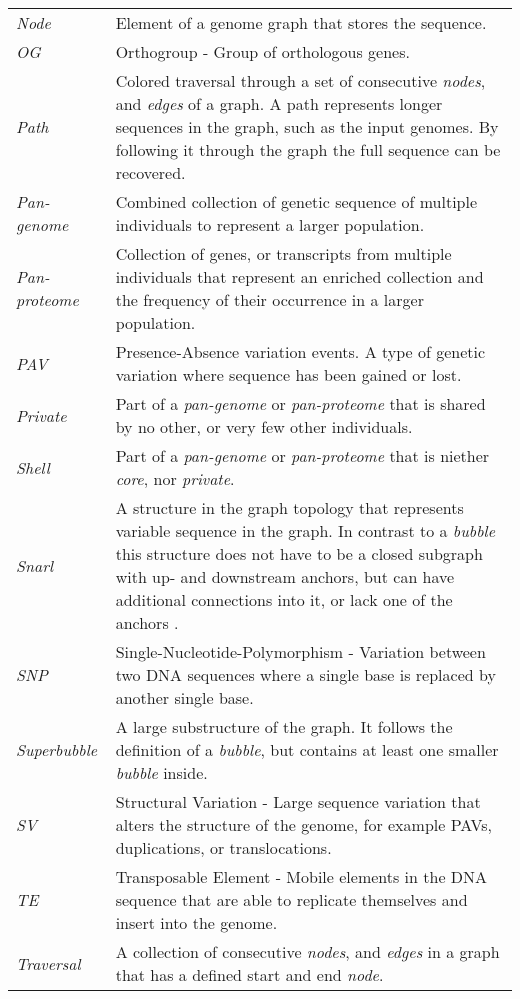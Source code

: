 \begin{longtable}[l]{p{}p{}}
\textit{Node} & Element of a genome graph that stores the sequence. \\
\textit{OG} & Orthogroup - Group of orthologous genes. \\
\textit{Path} & Colored traversal through a set of consecutive \textit{nodes}, and \textit{edges} of a graph. A path represents longer sequences in the graph, such as the input genomes. By following it through the graph the full sequence can be recovered. \\
\textit{Pan-genome} & Combined collection of genetic sequence of multiple individuals to represent a larger population. \\
\textit{Pan-proteome} & Collection of genes, or transcripts from multiple individuals that represent an enriched collection and the frequency of their occurrence in a larger population. \\
\textit{PAV} & Presence-Absence variation events. A type of genetic variation where sequence has been gained or lost. \\
\textit{Private} &Part of a \textit{pan-genome} or \textit{pan-proteome} that is shared by no other, or very few other individuals. \\
\textit{Shell} & Part of a \textit{pan-genome} or \textit{pan-proteome} that is niether \textit{core}, nor \textit{private}. \\
\textit{Snarl} & A structure in the graph topology that represents variable sequence in the graph. In contrast to a \textit{bubble} this structure does not have to be a closed subgraph with up- and downstream anchors, but can have additional connections into it, or lack one of the anchors \citep{Paten2018-qj}. \\
\textit{SNP} & Single-Nucleotide-Polymorphism - Variation between two DNA sequences where a single base is replaced by another single base. \\
\textit{Superbubble} & A large substructure of the graph. It follows the definition of a \textit{bubble}, but contains at least one smaller \textit{bubble} inside. \\
\textit{SV} & Structural Variation - Large sequence variation that alters the structure of the genome, for example PAVs, duplications, or translocations. \\
\textit{TE} & Transposable Element - Mobile elements in the DNA sequence that are able to replicate themselves and insert into the genome. \\
\textit{Traversal} & A collection of consecutive \textit{nodes}, and \textit{edges} in a graph that has a defined start and end \textit{node}. 
\end{longtable}

